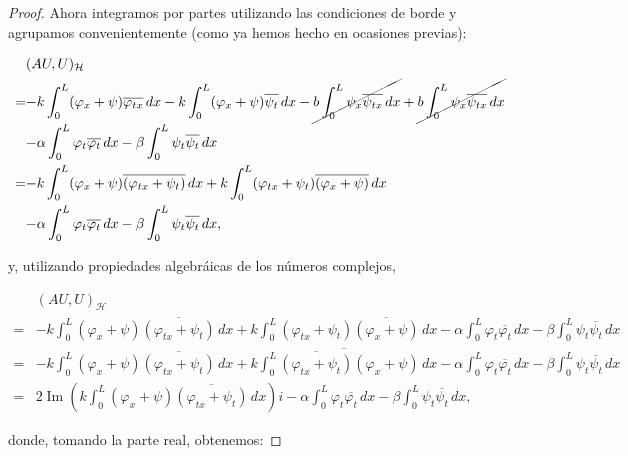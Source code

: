 \begin{proof}
    Ahora integramos por partes utilizando las condiciones de borde y agrupamos convenientemente (como ya hemos hecho en ocasiones previas):

    \begin{align*}
        &(AU, U)_{\mathcal{H}}\\
        =&
        \begin{aligned}[t]
            -&k\int_0^L(\varphi_x + \psi)\overline{\varphi_{tx}} \, dx - k\int_0^L(\varphi_x + \psi) \overline{\psi_t} \, dx - \cancel{b\int_0^L\psi_{x}\overline{\psi_{tx}} \, dx} + \cancel{b\int_0^L \psi_x \overline{\psi_{tx}} \, dx}\\
            -&\alpha \int_0^L \varphi_t \overline{\varphi_t}\, dx - \beta\int_0^L \psi_t \overline{\psi_t} \, dx
        \end{aligned}\\
        =&
        \begin{aligned}[t]
            -&k\int_0^L(\varphi_x + \psi)\overline{(\varphi_{tx} + \psi_t)} \, dx + k\int_0^L (\varphi_{tx} + \psi_t)\overline{(\varphi_x + \psi)} \, dx\\ 
            -&\alpha \int_0^L \varphi_t \overline{\varphi_t}\, dx - \beta\int_0^L \psi_t \overline{\psi_t} \, dx,
        \end{aligned}
    \end{align*}

    y, utilizando propiedades algebráicas de los números complejos,

    \begin{align*}
        &(AU, U)_{\mathcal{H}}\\
        =& -k\int_0^L(\varphi_x + \psi)\overline{(\varphi_{tx} + \psi_t)} \, dx + k\int_0^L (\varphi_{tx} + \psi_t)\overline{(\varphi_x + \psi)} \, dx -\alpha \int_0^L \varphi_t \overline{\varphi_t}\, dx - \beta\int_0^L \psi_t \overline{\psi_t} \, dx\\
        =& -k\int_0^L(\varphi_x + \psi)\overline{(\varphi_{tx} + \psi_t)} \, dx + \overline{k\int_0^L \overline{(\varphi_{tx} + \psi_t)}(\varphi_x + \psi) \, dx} -\alpha \int_0^L \varphi_t \overline{\varphi_t}\, dx - \beta\int_0^L \psi_t \overline{\psi_t} \, dx\\
        =& 2\operatorname{Im}\left(k\int_0^L(\varphi_x + \psi)\overline{(\varphi_{tx} + \psi_t)} \, dx \right)i -\alpha \int_0^L \varphi_t \overline{\varphi_t}\, dx - \beta\int_0^L \psi_t \overline{\psi_t} \, dx,
    \end{align*}

    donde, tomando la parte real, obtenemos:


\end{proof}
